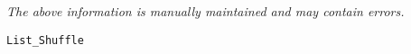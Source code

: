\label{pkg:list\_shuffle}

{\tiny \it The above information is manually maintained and may contain errors.}
\begin{verbatim}
List_Shuffle
\end{verbatim}
